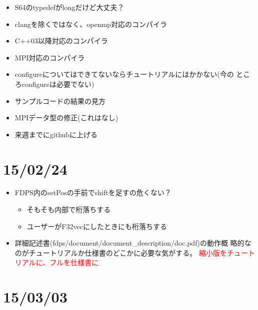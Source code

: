 \documentclass[12pt,a4paper]{jarticle}
\newcommand{\redtext}[1]{\textcolor{red}{#1}}
\begin{document}
\begin{itemize}
\item S64のtypedefがlongだけど大丈夫？
\item clangを除くではなく、openmp対応のコンパイラ
\item C++03以降対応のコンパイラ
\item MPI対応のコンパイラ
\item configureについてはできてないならチュートリアルにはかかない(今の
  ところconfigureは必要でない)
\item サンプルコードの結果の見方
\item MPIデータ型の修正(これはなし)
\item 来週までにgithubに上げる
\end{itemize}

\newpage

\section{15/02/24}

\begin{itemize}
\item FDPS内のsetPosの手前でshiftを足すの危くない？
  \begin{itemize}
  \item そもそも内部で桁落ちする
  \item ユーザーがF32vecにしたときにも桁落ちする   
  \end{itemize}
\item 詳細記述書(fdps/document/document\_description/doc.pdf)の動作概
  略的なのがチュートリアルか仕様書のどこかに必要な気がする。
  \redtext{縮小版をチュートリアルに、フルを仕様書に}
\end{itemize}

\newpage

\section{15/03/03}
\end{document}
